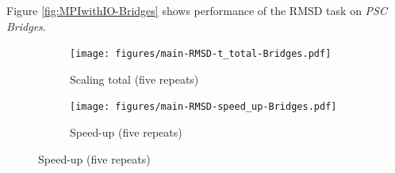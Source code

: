 \label{sec:supplement}

Figure \ref{fig:MPIwithIO-Bridges} shows performance of the RMSD task on \emph{PSC Bridges}. 

\begin{figure}[!htb]
  \centering
  \begin{subfigure}{.4\textwidth}
    \texttt{[image: figures/main-RMSD-t\_total-Bridges.pdf]}
    \caption{Scaling total (five repeats)}
    \label{fig:MPIscaling-Bridges}
  \end{subfigure}
  \hfill
  \begin{subfigure}{.4\textwidth}
    \texttt{[image: figures/main-RMSD-speed\_up-Bridges.pdf]}
    \caption{Speed-up (five repeats)}
    \label{fig:MPIspeedup-Bridges}
  \end{subfigure}
  \bigskip


\end{figure}

